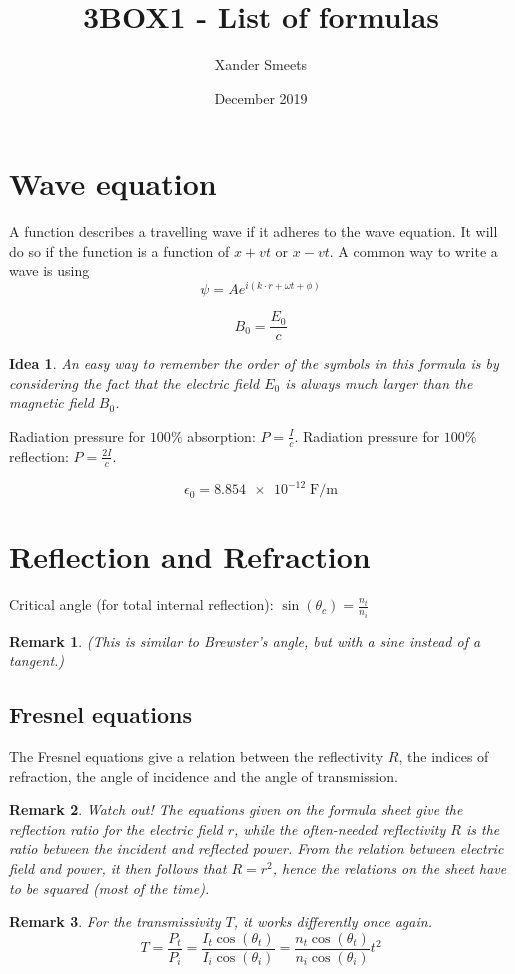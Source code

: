 \documentclass{article}
\title{3BOX1 - List of formulas}
\author{Xander Smeets}
\date{December 2019}
\newtheorem*{remark}{Remark}
\newtheorem*{idea}{Idea}
\begin{document}
\maketitle

\section{Wave equation}
A function describes a travelling wave if it adheres to the wave equation.
It will do so if the function is a function of $x+vt$ or $x-vt$.
A common way to write a wave is using $$\psi{}=A e^{i\left(k\cdot r + \omega t + \phi\right)}$$

$$B_0=\frac{E_0}{c}$$
\begin{idea}
An easy way to remember the order of the symbols in this formula is by considering the fact that the electric field $E_0$ is always much larger than the magnetic field $B_0$.
\end{idea}

\noindent{}Radiation pressure for $100\%$ absorption: $P=\frac{I}{c}$.\newline
Radiation pressure for $100\%$ reflection: $P=\frac{2I}{c}$.

$$\epsilon_0=\num{8.854e-12}\;  \si{\farad\per\metre}$$

\section{Reflection and Refraction}

Critical angle (for total internal reflection): $\sin(\theta{}_c)=\frac{n_t}{n_i}$\newline
\begin{remark}
(This is similar to Brewster's angle, but with a sine instead of a tangent.)
\end{remark}

\subsection{Fresnel equations}
The Fresnel equations give a relation between the reflectivity $R$, the indices of refraction, the angle of incidence and the angle of transmission.
\begin{remark}
Watch out!
The equations given on the formula sheet give the reflection ratio for the \emph{electric field} $r$, while the often-needed reflectivity $R$ is the ratio between the incident and reflected \emph{power}.
From the relation between electric field and power, it then follows that $R=r^2$, hence the relations on the sheet have to be squared (most of the time).
\end{remark}
\begin{remark}
For the transmissivity $T$, it works differently once again.
$$T=\frac{P_t}{P_i}=\frac{I_t\cos(\theta_t)}{I_i\cos(\theta_i)}=\frac{n_t\cos(\theta_t)}{n_i\cos(\theta_i)}t^2$$
\end{remark}
\end{document}
